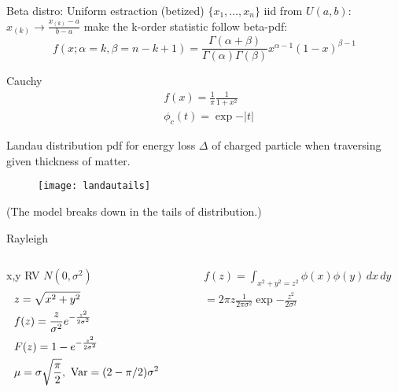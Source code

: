 \documentclass[asd-beamer.tex]{subfiles}
\begin{document}
\begin{frame}{Beta distro: Uniform estraction (betized)}
$\{x_1,\ldots,x_n\}$ iid from $U(a,b)$: $x_{(k)}\to\frac{x_{(k)}-a}{b-a}$ make the k-order statistic follow beta-pdf:
\[f(x;\alpha=k,\beta=n-k+1)=\frac{\Gamma(\alpha+\beta)}{\Gamma(\alpha)\Gamma(\beta)}x^{\alpha-1}(1-x)^{\beta-1}\]
\end{frame}

\begin{frame}{Cauchy}
\begin{align*}
&f(x)=\frac{1}{\pi}\frac{1}{1+x^2}\\
&\phi_c(t)=\exp{-|t|}
\end{align*}
\end{frame}

\begin{frame}{Landau distribution}
pdf for energy loss $\Delta$ of charged particle when traversing given thickness of matter.
\begin{figure}[!ht]\texttt{[image: landautails]}\label{fig:landautails}\end{figure}
(The model breaks down in the tails of distribution.)
\end{frame}

\begin{frame}{Rayleigh}
\begin{columns}[T]\begin{column}{0.5\textwidth}
x,y RV $N(0,\sigma^2)$
\begin{align*}
&z=\sqrt{x^2+y^2}\\
&f(z)=\frac{z}{\sigma^2}e^{-\frac{z^2}{2\sigma^2}}\\
&F(z)=1-e^{-\frac{z^2}{2\sigma^2}}\\
&\mu=\sigma\sqrt{\frac{\pi}{2}},\ \operatorname{Var}=(2-\pi/2)\sigma^2
\end{align*}
\end{column}\begin{column}{0.5\textwidth}
\begin{align*}
&f(z)=\int_{x^2+y^2=z^2}\phi(x)\phi(y)\,dx\,dy\\
&=2\pi z\frac{1}{2\pi\sigma^2}\exp{-\frac{z^2}{2\sigma^2}}
\end{align*}
\end{column}\end{columns}
\end{frame}
\end{document}
